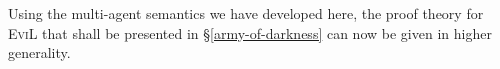 
Using the multi-agent semantics we have developed here, 
the proof theory for \textsc{EviL} that shall be presented in 
\S\ref{army-of-darkness} can now be given in higher generality.

